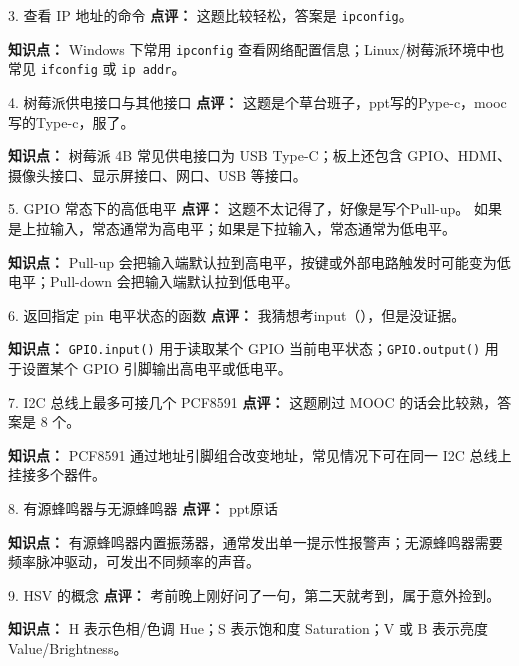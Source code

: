 \begin{question}{3. 查看 IP 地址的命令}
\textbf{点评：} 这题比较轻松，答案是 \texttt{ipconfig}。

\textbf{知识点：} Windows 下常用 \texttt{ipconfig} 查看网络配置信息；Linux/树莓派环境中也常见 \texttt{ifconfig} 或 \texttt{ip addr}。
\end{question}

\begin{question}{4. 树莓派供电接口与其他接口}
\textbf{点评：} 这题是个草台班子，ppt写的Pype-c，mooc写的Type-c，服了。

\textbf{知识点：} 树莓派 4B 常见供电接口为 USB Type-C；板上还包含 GPIO、HDMI、摄像头接口、显示屏接口、网口、USB 等接口。
\end{question}

\begin{question}{5. GPIO 常态下的高低电平}
\textbf{点评：} 这题不太记得了，好像是写个Pull-up。 如果是上拉输入，常态通常为高电平；如果是下拉输入，常态通常为低电平。

\textbf{知识点：} Pull-up 会把输入端默认拉到高电平，按键或外部电路触发时可能变为低电平；Pull-down 会把输入端默认拉到低电平。
\end{question}

\begin{question}{6. 返回指定 pin 电平状态的函数}
\textbf{点评：}  我猜想考input（），但是没证据。

\textbf{知识点：} \texttt{GPIO.input()} 用于读取某个 GPIO 当前电平状态；\texttt{GPIO.output()} 用于设置某个 GPIO 引脚输出高电平或低电平。
\end{question}

\begin{question}{7. I2C 总线上最多可接几个 PCF8591}
\textbf{点评：} 这题刷过 MOOC 的话会比较熟，答案是 8 个。

\textbf{知识点：} PCF8591 通过地址引脚组合改变地址，常见情况下可在同一 I2C 总线上挂接多个器件。
\end{question}

\begin{question}{8. 有源蜂鸣器与无源蜂鸣器}
\textbf{点评：} ppt原话

\textbf{知识点：} 有源蜂鸣器内置振荡器，通常发出单一提示性报警声；无源蜂鸣器需要频率脉冲驱动，可发出不同频率的声音。
\end{question}

\begin{question}{9. HSV 的概念}
\textbf{点评：} 考前晚上刚好问了一句，第二天就考到，属于意外捡到。

\textbf{知识点：} H 表示色相/色调 Hue；S 表示饱和度 Saturation；V 或 B 表示亮度 Value/Brightness。
\end{question}

